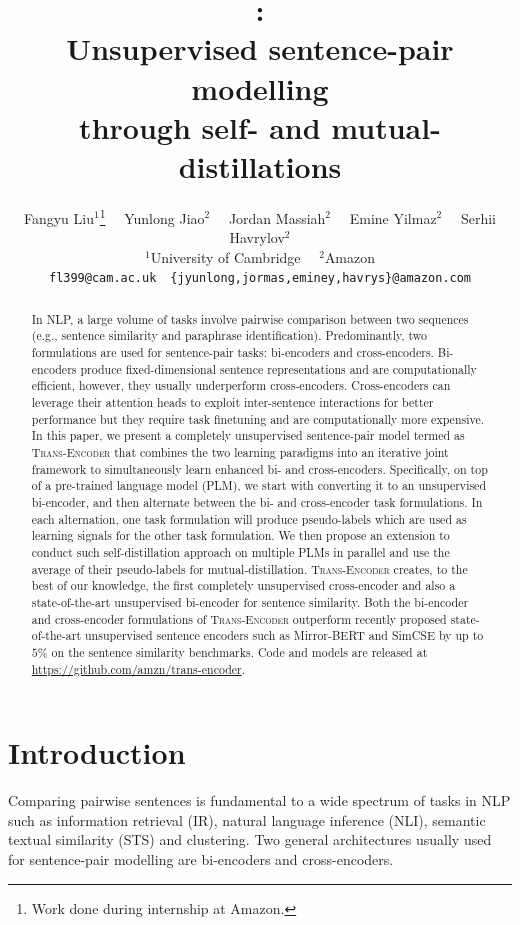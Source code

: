\documentclass{article} \usepackage{iclr2021_conference,times}
\title{\modelname: \\
Unsupervised sentence-pair modelling\\ through self- and mutual-distillations}
\author{Fangyu Liu$^{1}$\thanks{Work done during internship at Amazon.} \ \ Yunlong Jiao$^2$ \ \  Jordan Massiah$^2$ \ \ Emine Yilmaz$^2$ \ \ Serhii Havrylov$^2$ \\ 
$^1$University of Cambridge \ \
$^2$Amazon \\
\texttt{fl399@cam.ac.uk}\ \ \texttt{\{jyunlong,jormas,eminey,havrys\}@amazon.com} \\
}
\newcommand{\modelname}{\textsc{Trans-Encoder}\xspace}
\begin{document}
\maketitle

\begin{abstract}
In NLP, a large volume of tasks involve pairwise comparison between two sequences (e.g., sentence similarity and paraphrase identification). 
Predominantly, two formulations are used for sentence-pair tasks: bi-encoders and cross-encoders. 
Bi-encoders produce fixed-dimensional sentence representations and are computationally efficient, however, they usually underperform cross-encoders. 
Cross-encoders can leverage their attention heads to exploit inter-sentence interactions for better performance but they require task finetuning and are computationally more expensive. 
In this paper, we present a completely unsupervised sentence-pair model termed as \modelname that combines the two learning paradigms into an iterative joint framework to simultaneously learn enhanced bi- and cross-encoders. 
Specifically, on top of a pre-trained language model (PLM), we start with converting it to an unsupervised bi-encoder, and then alternate between the bi- and cross-encoder task formulations. 
In each alternation, one task formulation will produce pseudo-labels which are used as learning signals for the other task formulation. We then propose an extension to conduct such self-distillation approach on multiple PLMs in parallel and use the average of their pseudo-labels for mutual-distillation. 
\modelname creates, to the best of our knowledge, the first completely unsupervised cross-encoder and also a state-of-the-art unsupervised bi-encoder for sentence similarity. 
Both the bi-encoder and cross-encoder formulations of \modelname outperform recently proposed state-of-the-art unsupervised sentence encoders such as Mirror-BERT \citep{liu2021fast} and SimCSE \citep{gao2021simcse} by up to $5\%$ on the sentence similarity benchmarks. Code and models are released at \url{https://github.com/amzn/trans-encoder}.

\end{abstract}

\section{Introduction}
Comparing pairwise sentences is fundamental to a wide spectrum of tasks in NLP such as information retrieval (IR), natural language inference (NLI), semantic textual similarity (STS) and clustering. 
Two general architectures usually used for sentence-pair modelling are bi-encoders and cross-encoders. 
\end{document}
